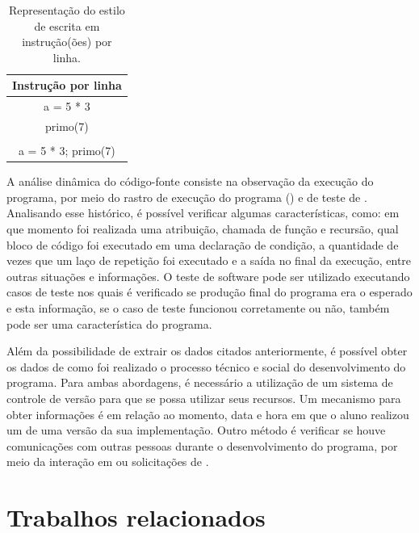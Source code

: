 			\begin{table}
				\centering
				\begin{tabular}{|c|}
					\hline
					Instrução por linha \\ \hline
					a = 5 * 3  \\
					primo(7)	 \\
					\\
					a = 5 * 3; primo(7)	\\
					\hline
				\end{tabular}
				\caption{Representação do estilo de escrita em instrução(ões) por linha.}
				\label{tab:estEscInstrucao}
			\end{table}
			
			A análise dinâmica do código-fonte consiste na observação da execução do
			programa, por meio do rastro de execução do programa () e
			de teste de . Analisando esse histórico, é possível
			verificar algumas características, como: em que momento foi realizada
			uma atribuição, chamada de função e recursão, qual bloco de código foi
			executado em uma declaração de condição, a quantidade de vezes que um laço
			de repetição foi executado e a saída no final da execução, entre outras situações
			e informações. O teste de software pode ser utilizado executando casos de teste
			nos quais é verificado se produção final do programa era o esperado e esta
			informação, se o caso de teste funcionou corretamente ou não, também pode
			ser uma característica do programa.
			
			Além da possibilidade de extrair os dados citados anteriormente, é possível
			obter os dados de como foi realizado o processo técnico e social do desenvolvimento
			do programa. Para ambas abordagens, é necessário a utilização de um sistema de
			controle de versão para que se possa utilizar seus recursos. Um mecanismo para
			obter informações é em relação ao momento, data e hora em que o aluno realizou
			um  de uma versão da sua implementação. Outro método é verificar
			se houve comunicações com outras pessoas durante o desenvolvimento do programa,
			por meio da interação em  ou solicitações de .
			

	\section{Trabalhos relacionados}
	\label{sec:TrabRel}
	
